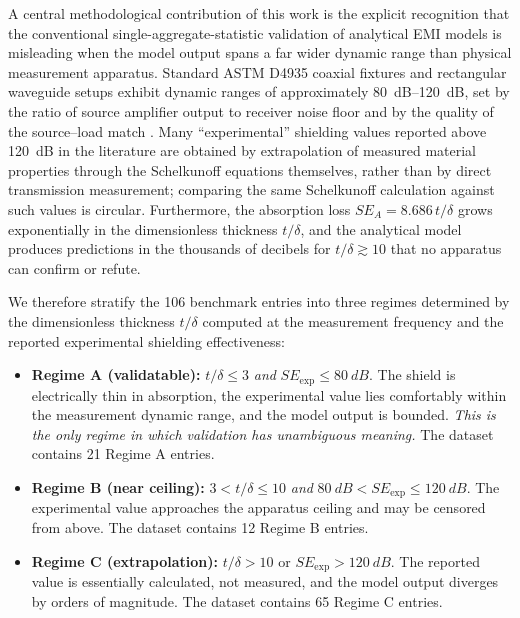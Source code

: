 \documentclass[review,3p,authoryear]{elsarticle}
\begin{document}
A central methodological contribution of this work is the explicit recognition that the conventional single-aggregate-statistic validation of analytical EMI models is misleading when the model output spans a far wider dynamic range than physical measurement apparatus. Standard ASTM D4935 coaxial fixtures and rectangular waveguide setups exhibit dynamic ranges of approximately \SIrange{80}{120}{dB}, set by the ratio of source amplifier output to receiver noise floor and by the quality of the source--load match \citep{Schulz1988, Celozzi2008}. Many ``experimental'' shielding values reported above \SI{120}{dB} in the literature are obtained by extrapolation of measured material properties through the Schelkunoff equations themselves, rather than by direct transmission measurement; comparing the same Schelkunoff calculation against such values is circular. Furthermore, the absorption loss $SE_A = 8.686\,t/\delta$ grows exponentially in the dimensionless thickness $t/\delta$, and the analytical model produces predictions in the thousands of decibels for $t/\delta \gtrsim 10$ that no apparatus can confirm or refute.

We therefore stratify the \num{106} benchmark entries into three regimes determined by the dimensionless thickness $t/\delta$ computed at the measurement frequency and the reported experimental shielding effectiveness:

\begin{itemize}
\item \textbf{Regime A (validatable):} $t/\delta \leq 3$ \emph{and} $SE_{\mathrm{exp}} \leq \SI{80}{dB}$. The shield is electrically thin in absorption, the experimental value lies comfortably within the measurement dynamic range, and the model output is bounded. \emph{This is the only regime in which validation has unambiguous meaning.} The dataset contains \num{21} Regime A entries.
\item \textbf{Regime B (near ceiling):} $3 < t/\delta \leq 10$ \emph{and} $\SI{80}{dB} < SE_{\mathrm{exp}} \leq \SI{120}{dB}$. The experimental value approaches the apparatus ceiling and may be censored from above. The dataset contains \num{12} Regime B entries.
\item \textbf{Regime C (extrapolation):} $t/\delta > 10$ or $SE_{\mathrm{exp}} > \SI{120}{dB}$. The reported value is essentially calculated, not measured, and the model output diverges by orders of magnitude. The dataset contains \num{65} Regime C entries.
\end{itemize}
\end{document}

